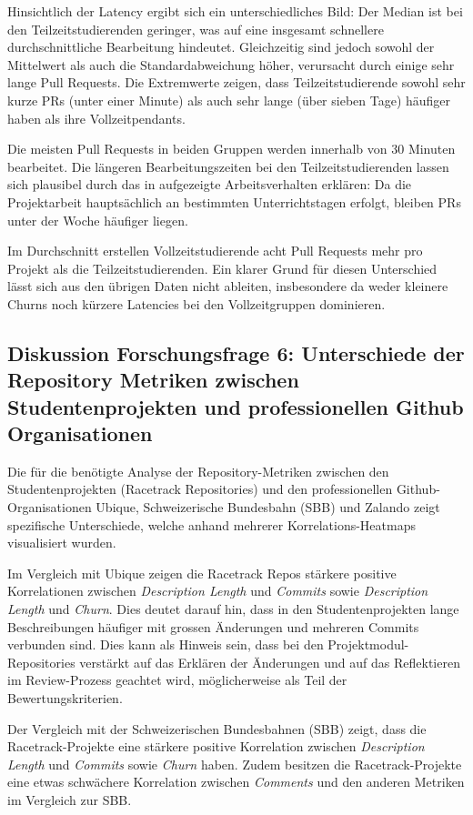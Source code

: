 Hinsichtlich der Latency ergibt sich ein unterschiedliches Bild: Der Median ist bei den Teilzeitstudierenden geringer, was auf eine insgesamt schnellere durchschnittliche Bearbeitung hindeutet. Gleichzeitig sind jedoch sowohl der Mittelwert als auch die Standardabweichung höher, verursacht durch einige sehr lange Pull Requests. Die Extremwerte zeigen, dass Teilzeitstudierende sowohl sehr kurze PRs (unter einer Minute) als auch sehr lange (über sieben Tage) häufiger haben als ihre Vollzeitpendants.

Die meisten Pull Requests in beiden Gruppen werden innerhalb von 30 Minuten bearbeitet. Die längeren Bearbeitungszeiten bei den Teilzeitstudierenden lassen sich plausibel durch das in  aufgezeigte Arbeitsverhalten erklären: Da die Projektarbeit hauptsächlich an bestimmten Unterrichtstagen erfolgt, bleiben PRs unter der Woche häufiger liegen.

Im Durchschnitt erstellen Vollzeitstudierende acht Pull Requests mehr pro Projekt als die Teilzeitstudierenden. Ein klarer Grund für diesen Unterschied lässt sich aus den übrigen Daten nicht ableiten, insbesondere da weder kleinere Churns noch kürzere Latencies bei den Vollzeitgruppen dominieren. 

\subsection{Diskussion Forschungsfrage 6: Unterschiede der Repository Metriken zwischen Studentenprojekten und professionellen Github Organisationen}
Die für die  benötigte Analyse der Repository-Metriken zwischen den Studentenprojekten (Racetrack Repositories) und den professionellen Github-Organisationen Ubique, Schweizerische Bundesbahn (SBB) und Zalando zeigt spezifische Unterschiede, welche anhand mehrerer Korrelations-Heatmaps visualisiert wurden. 

Im Vergleich mit Ubique zeigen die Racetrack Repos stärkere positive Korrelationen zwischen \textit{Description Length} und \textit{Commits} sowie \textit{Description Length} und \textit{Churn}. Dies deutet darauf hin, dass in den Studentenprojekten lange Beschreibungen häufiger mit grossen Änderungen und mehreren Commits verbunden sind. Dies kann als Hinweis sein, dass bei den Projektmodul-Repositories verstärkt auf das Erklären der Änderungen und auf das Reflektieren im Review-Prozess geachtet wird, möglicherweise als Teil der Bewertungskriterien. 

Der Vergleich mit der Schweizerischen Bundesbahnen (SBB) zeigt, dass die Racetrack-Projekte eine stärkere positive Korrelation zwischen \textit{Description Length} und \textit{Commits} sowie \textit{Churn} haben. Zudem besitzen die Racetrack-Projekte eine etwas schwächere Korrelation zwischen \textit{Comments} und den anderen Metriken im Vergleich zur SBB.

